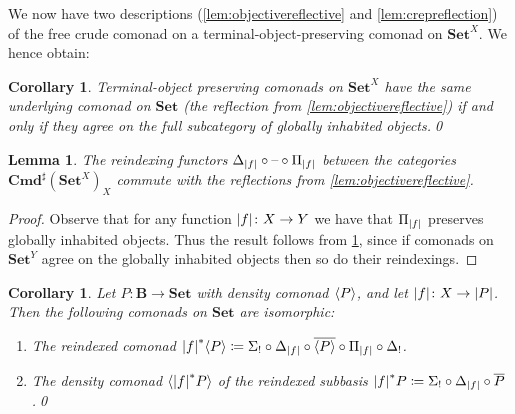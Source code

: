 \documentclass[11pt, oneside, article]{memoir}
\theoremstyle{plain}
\newtheorem{corollary}[theorem]{Corollary}
\newtheorem{lemma}[theorem]{Lemma}
\theoremstyle{definition}
\theoremstyle{remark}
\DeclarePairedDelimiter{\gen}{\langle}{\rangle}
\DeclarePairedDelimiter{\abs}{\lvert}{\rvert}
\newcommand{\dash}{{\mathord{\text{--}}}}
\newcommand{\bang}{\mathrm{!}}
\newcommand{\namedcat}[1]{\mathbf{#1}}
\newcommand{\cat}[1]{\mathbf{#1}}
\newcommand{\Set}{\namedcat{Set}}
\newcommand{\Com}{\namedcat{Cmd}^\sharp}
\newcommand{\clift}[1]{\overline{#1}}
\newcommand{\pts}[1]{{\abs{#1}}}
\newcommand{\one}[1]{\pts{#1}}
\newcommand{\ptlift}[1]{\overline{#1}}
\newcommand{\reindex}[1]{\Delta_{#1}}
\newcommand{\slicel}{\Sigma_\bang}
\newcommand{\slicer}{\Delta_\bang}
\newcommand{\ph}[1]{#1}
\newcommand{\xX}{X}
\newcommand{\xY}{Y}
\newcommand{\bB}{\cat{B}}
\newcommand{\pP}{\ph{P}}
\newcommand{\cP}{\gen{\pP}}
\begin{document}
We now have two descriptions (\cref{lem:objectivereflective} and
\cref{lem:crepreflection}) of the free crude comonad on a
terminal-object-preserving comonad on $\Set^\xX$. We hence obtain:

\begin{corollary}\label{lem:surjsufficient}
  Terminal-object preserving comonads on $\Set^\xX$ have the same
  underlying comonad on $\Set$ (the reflection from
  \cref{lem:objectivereflective}) if and only if they agree on the
  full subcategory of globally inhabited objects.\qed
\end{corollary}


\begin{lemma}\label{cor:reindexreflect}
  The reindexing functors $\reindex{\one{f}} \circ \dash \circ \Pi_\one{f}$ between
  the categories $\Com(\Set^\xX)_\xX$ commute with the reflections from
  \cref{lem:objectivereflective}.
\end{lemma}
\begin{proof}
  Observe that for any function $\one{f}\colon \xX \to \xY$ we have
  that $\Pi_\one{f}$ preserves globally inhabited objects. Thus the
  result follows from \cref{lem:surjsufficient}, since if comonads on
  $\Set^\xY$ agree on the globally inhabited objects then so do their reindexings.
\end{proof}

\begin{corollary}\label{lem:reindexbasis}
  Let $\pP \colon \bB \to \Set$ with density comonad $\cP$, and let
  $\one{f} \colon \xX \to \pts{\pP}$. Then the following comonads on $\Set$
  are isomorphic:
  \begin{enumerate}[label=(\roman*)]
  \item The reindexed comonad
    $\one{f}^*\cP \coloneqq \slicel \circ \reindex{\one{f}} \circ
    \clift{\cP} \circ \Pi_\one{f} \circ \slicer$.
  \item The density comonad $\gen{\one{f}^*\pP}$ of the reindexed
    subbasis
    $\one{f}^*\pP \coloneqq \slicel \circ \reindex{\one{f}} \circ
    \ptlift{\pP}$.\qed
  \end{enumerate}
\end{corollary}
\end{document}

